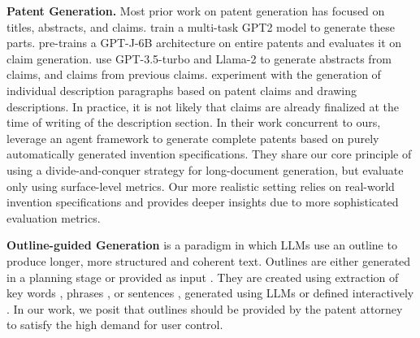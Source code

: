 \noindent\textbf{Patent Generation. }
Most prior work on patent generation has focused on titles, abstracts, and claims.
\citet{christofidellisPGTPromptBased2022} train a multi-task GPT2 model to generate these parts.
\citet{leeEvaluatingGenerativePatent2023} pre-trains a GPT-J-6B architecture on entire patents and evaluates it on claim generation.
\citet{zuoPatentEvalUnderstandingErrors2024} use GPT-3.5-turbo and Llama-2 to generate abstracts from claims, and claims from previous claims.
\citet{wangPatentformerNovelMethod2024} experiment with the generation of individual description paragraphs based on patent claims and drawing descriptions.
In practice, it is not likely that claims are already finalized at the time of writing of the description section.
In their work concurrent to ours, \citet{wangAutoPatentMultiAgentFramework2024} leverage an agent framework to generate complete patents based on purely automatically generated invention specifications.
They share our core principle of using a divide-and-conquer strategy for long-document generation, but evaluate only using surface-level metrics.
Our more realistic setting relies on real-world invention specifications and provides deeper insights due to more sophisticated evaluation metrics.

\noindent\textbf{Outline-guided Generation}
is a paradigm in which LLMs use an outline to produce longer, more structured and coherent text.
Outlines are either generated in a planning stage 
\cite{drissiHierarchicalTextGeneration2018,yaoPlanandWriteBetterAutomatic2019,sunSummarizeOutlineElaborate2022a,yang-etal-2022-re3,leeNavigatingPathWriting2024,wangAutoSurveyLargeLanguage,shaoAssistingWritingWikipedialike2024} 
or provided as input 
\cite{fangOutlineStoryFinegrained2021a,spangher-etal-2022-sequentially,yangDOCImprovingLong2023,liAdvancingPreciseOutlineConditioned2023}.
They are created using extraction of key words 
\cite{yaoPlanandWriteBetterAutomatic2019}, 
phrases 
\cite{fangOutlineStoryFinegrained2021a}, 
or sentences 
\cite{drissiHierarchicalTextGeneration2018,sunSummarizeOutlineElaborate2022a,yang-etal-2022-re3,liAdvancingPreciseOutlineConditioned2023}, 
generated using LLMs 
\cite{yangDOCImprovingLong2023} or 
defined interactively 
\cite{goldfarb-tarrant-etal-2019-plan}.
In our work, we posit that outlines should be provided by the patent attorney to satisfy the high demand for user control. %

